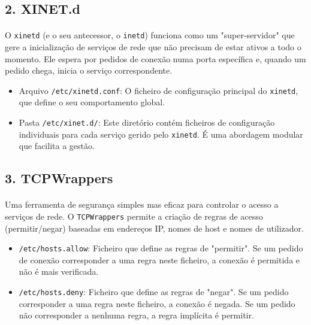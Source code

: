 \documentclass[10pt,a4paper]{article}
\begin{document}
		\subsection*{2. XINET.d}
		\vspace{-1.2em}
		\paragraph{}
		O \texttt{xinetd} (e o seu antecessor, o \texttt{inetd}) funciona como um "super-servidor" que gere a inicialização de serviços de rede que não precisam de estar ativos a todo o momento. Ele espera por pedidos de conexão numa porta específica e, quando um pedido chega, inicia o serviço correspondente.
		
		\begin{itemize}
			\item Arquivo \texttt{/etc/xinetd.conf}: O ficheiro de configuração principal do \texttt{xinetd}, que define o seu comportamento global.
			\item Pasta \texttt{/etc/xinet.d/}: Este diretório contém ficheiros de configuração individuais para cada serviço gerido pelo \texttt{xinetd}. É uma abordagem modular que facilita a gestão.
		\end{itemize}
		
		\subsection*{3. TCPWrappers}
		\vspace{-1.2em}
		\paragraph{}
		Uma ferramenta de segurança simples mas eficaz para controlar o acesso a serviços de rede. O \texttt{TCPWrappers} permite a criação de regras de acesso (permitir/negar) baseadas em endereços IP, nomes de host e nomes de utilizador.
		
		\begin{itemize}
			\item \texttt{/etc/hosts.allow}: Ficheiro que define as regras de "permitir". Se um pedido de conexão corresponder a uma regra neste ficheiro, a conexão é permitida e não é mais verificada.
			\item \texttt{/etc/hosts.deny}: Ficheiro que define as regras de "negar". Se um pedido corresponder a uma regra neste ficheiro, a conexão é negada. Se um pedido não corresponder a nenhuma regra, a regra implícita é permitir.
		\end{itemize}
		
\end{document}
